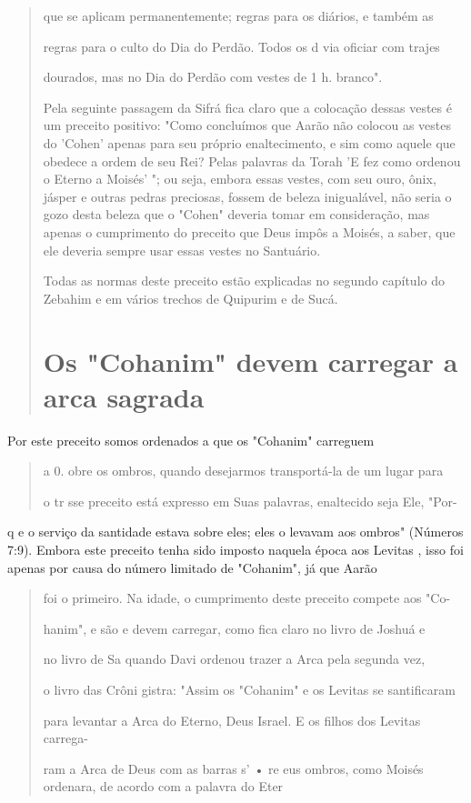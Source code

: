\begin{quote}
que se aplicam permanentemente; regras para os diários, e também as

regras para o culto do Dia do Perdão. Todos os d via oficiar com trajes

dourados, mas no Dia do Perdão com vestes de 1 h. branco".

Pela seguinte passagem da Sifrá fica claro que a colocação dessas
ves­tes é um preceito positivo: "Como concluímos que Aarão não colocou
as ves­tes do 'Cohen' apenas para seu próprio enaltecimento, e sim como
aquele que obedece a ordem de seu Rei? Pelas palavras da Torah 'E fez
como ordenou o Eterno a Moisés' "; ou seja, embora essas vestes, com seu
ouro, ônix, jásper e outras pedras preciosas, fossem de beleza
inigualável, não seria o gozo desta beleza que o "Cohen" deveria tomar
em consideração, mas apenas o cumpri­mento do preceito que Deus impôs a
Moisés, a saber, que ele deveria sempre usar essas vestes no Santuário.

Todas as normas deste preceito estão explicadas no segundo capítu­lo do
Zebahim e em vários trechos de Quipurim e de Sucá.

\section{Os "Cohanim" devem carregar a arca sagrada}

\end{quote}

Por este preceito somos ordenados a que os "Cohanim" carreguem

\begin{quote}
a 0. obre os ombros, quando desejarmos transportá-la
de um lugar para

o tr sse preceito está expresso em Suas palavras, enaltecido seja Ele,
"Por-
\end{quote}

q e o serviço da santidade estava sobre eles; eles o levavam aos ombros"
(Números
7:9). Embora este preceito tenha sido imposto naquela época aos
Levitas
, isso foi apenas por causa do número limitado de "Cohanim", já que
Aarão

\begin{quote}
foi o primeiro. Na idade, o cumprimento deste preceito compete aos "Co-

hanim", e são e devem carregar, como fica claro no livro de Joshuá e

no livro de Sa quando Davi ordenou trazer a Arca pela segunda vez,

o livro das Crôni gistra: "Assim os "Cohanim" e os Levitas se
santificaram

para levantar a Arca do Eterno, Deus Israel. E os filhos dos Levitas
carrega-

ram a Arca de Deus com as barras s' • re eus ombros, como Moisés
ordenara, de acordo com a palavra do Eter
\end{quote}

